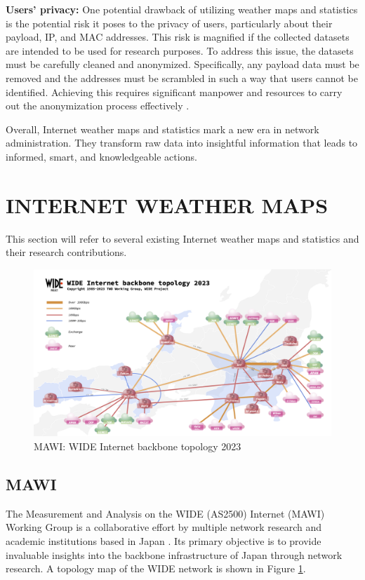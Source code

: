 \documentclass[sigconf,authorversion,nonacm]{acmart}
\begin{document}
\textbf{Users' privacy:} One potential drawback of utilizing weather maps and statistics is the potential risk it poses to the privacy of users, particularly about their payload, IP, and MAC addresses. This risk is magnified if the collected datasets are intended to be used for research purposes. To address this issue, the datasets must be carefully cleaned and anonymized. Specifically, any payload data must be removed and the addresses must be scrambled in such a way that users cannot be identified. Achieving this requires significant manpower and resources to carry out the anonymization process effectively \cite{271335}.

Overall, Internet weather maps and statistics mark a new era in network administration. They transform raw data into insightful information that leads to informed, smart, and knowledgeable actions.

\section{INTERNET WEATHER MAPS}
This section will refer to several existing Internet weather maps and statistics and their research contributions.
\begin{figure}[H]
    \centering
    \includegraphics[width=\linewidth]{MAWI/wide topology.png}
    \caption{MAWI: WIDE Internet backbone topology 2023}
    \label{MAWI: WIDE Internet backbone topology 2023}
\end{figure}

\subsection{MAWI} The Measurement and Analysis on the WIDE (AS2500) Internet (MAWI) Working Group is a collaborative effort by multiple network research and academic institutions based in Japan \cite{271335}. Its primary objective is to provide invaluable insights into the backbone infrastructure of Japan through network research. A topology map of the WIDE network is shown in Figure \ref{MAWI: WIDE Internet backbone topology 2023}.
\end{document}
